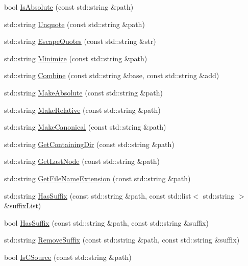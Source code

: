 \begin{DoxyCompactItemize}
\item 
bool \hyperlink{namespacepath_a45b8e7862073af3d077ee44ef0697bf2}{Is\+Absolute} (const std\+::string \&path)
\item 
std\+::string \hyperlink{namespacepath_a9cf33e3fdeb3103bbbffe30632032266}{Unquote} (const std\+::string \&path)
\item 
std\+::string \hyperlink{namespacepath_a8ed674d40392cc3f41b5bd3b8ff97842}{Escape\+Quotes} (const std\+::string \&str)
\item 
std\+::string \hyperlink{namespacepath_ad2d0b1160d5e9b1382d674cbe2ee8769}{Minimize} (const std\+::string \&path)
\item 
std\+::string \hyperlink{namespacepath_a52547f49e692917f3405c65cb881aa1c}{Combine} (const std\+::string \&base, const std\+::string \&add)
\item 
std\+::string \hyperlink{namespacepath_a568976762f738bc3b6a5ec26a8a32c46}{Make\+Absolute} (const std\+::string \&path)
\item 
std\+::string \hyperlink{namespacepath_a5f910aef5c9f2268493a14d3550ed676}{Make\+Relative} (const std\+::string \&path)
\item 
std\+::string \hyperlink{namespacepath_a44ae422465654982d8220d53f5f611f7}{Make\+Canonical} (const std\+::string \&path)
\item 
std\+::string \hyperlink{namespacepath_afe434446f5a4df19ae83bfd2cfea6536}{Get\+Containing\+Dir} (const std\+::string \&path)
\item 
std\+::string \hyperlink{namespacepath_a5c0b138f721ba16a597cb45c02a9a559}{Get\+Last\+Node} (const std\+::string \&path)
\item 
std\+::string \hyperlink{namespacepath_ae840a6e8d250628f9567690984ed7416}{Get\+File\+Name\+Extension} (const std\+::string \&path)
\item 
std\+::string \hyperlink{namespacepath_aca906ba1f9f2375027d833c12b387ccc}{Has\+Suffix} (const std\+::string \&path, const std\+::list$<$ std\+::string $>$ \&suffix\+List)
\item 
bool \hyperlink{namespacepath_a57ca516c90a2707d47936d7a0ee59aa4}{Has\+Suffix} (const std\+::string \&path, const std\+::string \&suffix)
\item 
std\+::string \hyperlink{namespacepath_abd9585efbe211dda9bfb7b2ca7c196cb}{Remove\+Suffix} (const std\+::string \&path, const std\+::string \&suffix)
\item 
bool \hyperlink{namespacepath_a8cb09f913227650d334973aba5acdff6}{Is\+C\+Source} (const std\+::string \&path)

\end{DoxyCompactItemize}
